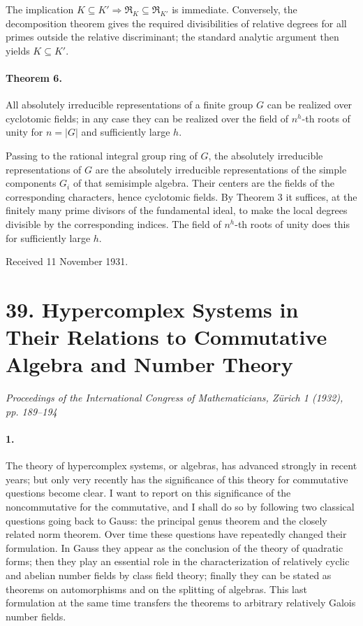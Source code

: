 \documentclass[11pt]{article}
\begin{document}
The implication \(K\subseteq K'\Rightarrow\mathfrak R_K\subseteq\mathfrak R_{K'}\) is immediate. Conversely, the decomposition theorem gives the required divisibilities of relative degrees for all primes outside the relative discriminant; the standard analytic argument then yields \(K\subseteq K'\).

\paragraph{Theorem 6.}
All absolutely irreducible representations of a finite group \(G\) can be realized over cyclotomic fields; in any case they can be realized over the field of \(n^h\)-th roots of unity for \(n=|G|\) and sufficiently large \(h\).

Passing to the rational integral group ring of \(G\), the absolutely irreducible representations of \(G\) are the absolutely irreducible representations of the simple components \(G_i\) of that semisimple algebra. Their centers are the fields of the corresponding characters, hence cyclotomic fields. By Theorem 3 it suffices, at the finitely many prime divisors of the fundamental ideal, to make the local degrees divisible by the corresponding indices. The field of \(n^h\)-th roots of unity does this for sufficiently large \(h\).

\begin{center}
Received 11 November 1931.
\end{center}

\section*{39. Hypercomplex Systems in Their Relations to Commutative Algebra and Number Theory}

\begin{center}
\emph{Proceedings of the International Congress of Mathematicians, Zürich 1 (1932), pp. 189--194}
\end{center}

\paragraph{1.}
The theory of hypercomplex systems, or algebras, has advanced strongly in recent years; but only very recently has the significance of this theory for commutative questions become clear. I want to report on this significance of the noncommutative for the commutative, and I shall do so by following two classical questions going back to Gauss: the principal genus theorem and the closely related norm theorem. Over time these questions have repeatedly changed their formulation. In Gauss they appear as the conclusion of the theory of quadratic forms; then they play an essential role in the characterization of relatively cyclic and abelian number fields by class field theory; finally they can be stated as theorems on automorphisms and on the splitting of algebras. This last formulation at the same time transfers the theorems to arbitrary relatively Galois number fields.
\end{document}
